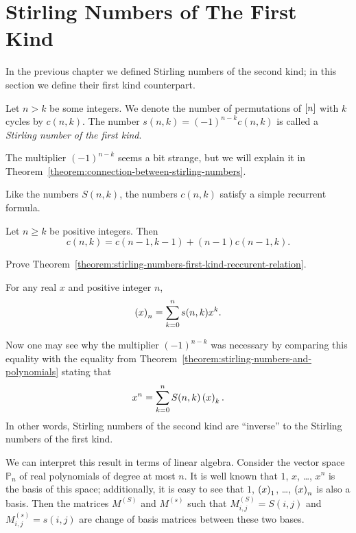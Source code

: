 \section{Stirling Numbers of The First Kind}
In the previous chapter we defined Stirling numbers of the second kind; in this
section we define their first kind counterpart.

\begin{definition}
  Let $n > k$ be some integers. We denote the number of permutations of
  ${[{n}]}$ with $k$ cycles by $c(n, k)$. The number $s(n, k) = (-1)^{n - k}
  c(n, k)$ is called a \emph{Stirling number of the first kind}.
\end{definition}
The multiplier $(-1)^{n - k}$ seems a bit strange, but we will explain it
in Theorem~\ref{theorem:connection-between-stirling-numbers}.

Like the numbers $S(n, k)$, the numbers $c(n, k)$ satisfy a simple recurrent
formula.
\begin{theorem}
\label{theorem:stirling-numbers-first-kind-reccurent-relation}
  Let $n \ge k$ be positive integers. Then
  \[
    c(n, k) = c(n - 1, k - 1) + (n - 1) c(n - 1, k).
  \]
\end{theorem}

\begin{exercise}
  Prove Theorem~\ref{theorem:stirling-numbers-first-kind-reccurent-relation}.
\end{exercise}

\begin{theorem}
\label{theorem:connection-between-stirling-numbers}
  For any real $x$ and positive integer $n$,
  \[
    \numberOfPermutations[n]{x} = \sum_{k = 0}^n s(n, k) x^k.
  \]
\end{theorem}
Now one may see why the multiplier $(-1)^{n - k}$ was necessary by comparing
this equality with the equality from
Theorem~\ref{theorem:stirling-numbers-and-polynomials} stating that
\[
  x^n = \sum_{k = 0}^n S(n, k) \numberOfPermutations[k]{x}.
\]
In other words, Stirling numbers of the second kind are ``inverse'' to the
Stirling numbers of the first kind.

We can interpret this result in terms of linear algebra. Consider the vector
space $\mathbb{P}_n$ of real polynomials of degree at most $n$. It is well
known that $1$, $x$, \dots, $x^n$ is the basis of this space; additionally,
it is easy to see that $1$, $\numberOfPermutations[1]{x}$, \dots,
$\numberOfPermutations[n]{x}$ is also a basis. Then
the matrices $M^{(S)}$ and $M^{(s)}$ such that
$M^{(S)}_{i, j} = S(i, j)$ and $M^{(s)}_{i, j} = s(i, j)$ are
change of basis matrices between these two bases.

